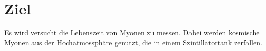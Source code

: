 \section{Ziel}
\label{sec:ziel}
Es wird versucht die Lebenszeit von Myonen zu messen. Dabei werden kosmische Myonen aus der Hochatmossphäre genutzt, die in einem Szintillatortank zerfallen.